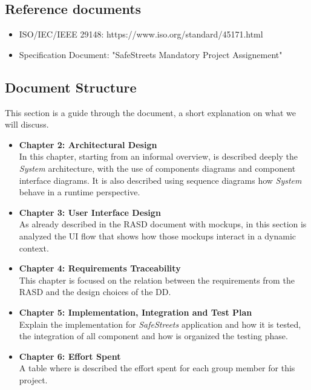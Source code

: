 \documentclass{article}
\begin{document}
\subsection{Reference documents}
\begin{itemize}
    \item ISO/IEC/IEEE 29148: https://www.iso.org/standard/45171.html
    \item Specification Document: "SafeStreets Mandatory Project Assignement"
\end{itemize}

\subsection{Document Structure}
This section is a guide through the document, a short explanation on what we will discuss.
\begin{itemize}
    \item \textbf{Chapter 2: Architectural Design}\\
    In this chapter, starting from an informal overview, is described deeply the \textit{System}
    architecture, with the use of components diagrams and component interface diagrams. It is also
    described using sequence diagrams how \textit{System} behave in a runtime perspective.

    \item \textbf{Chapter 3: User Interface Design}\\
    As already described in the RASD document with mockups, in this section is analyzed the 
    UI flow that shows how those mockups interact in a dynamic context.

    \item \textbf{Chapter 4: Requirements Traceability}\\
    This chapter is focused on the relation between the requirements from the RASD and
    the design choices of the DD.

    \item \textbf{Chapter 5: Implementation, Integration and Test Plan}\\
    Explain the implementation for \textit{SafeStreets} application and how it is 
    tested, the integration of all component and how is organized the testing phase.

    \item \textbf{Chapter 6: Effort Spent}\\
    A table where is described the effort spent for each group member for this project.

\end{itemize}
\end{document}
